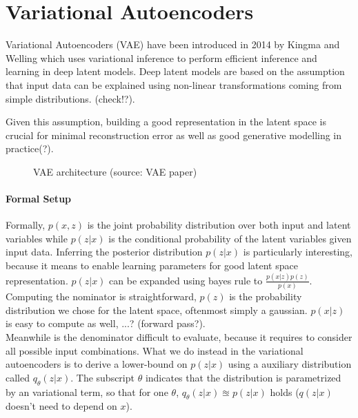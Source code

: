 \section{Variational Autoencoders \cite{vae:2013}}
\label{sec:vae}
Variational Autoencoders (VAE) have been introduced in 2014 by Kingma and Welling which uses variational inference to perform efficient inference and learning in deep latent models.
Deep latent models are based on the assumption that input data can be explained using non-linear transformations coming from simple distributions. \cite{rezende:2014} (check!?).

Given this assumption, building a good representation in the latent space is crucial for minimal reconstruction error as well as good generative modelling in practice(?).

\begin{figure}[htb]
\centering

  \caption{VAE architecture (source: VAE paper)}\label{fig:vae_architecture}
\end{figure}

\paragraph{Formal Setup}
Formally, $p(x,z)$ is the joint probability distribution over both input and latent variables while $p(z|x)$ is the conditional probability of the latent variables given input data.
Inferring the posterior distribution $p(z|x)$ is particularly interesting, because it means to enable learning parameters for good latent space representation.
$p(z|x)$ can be expanded using bayes rule to $\frac{p(x|z) p(z)}{p(x)}$.
Computing the nominator is straightforward, $p(z)$ is the probability distribution we chose for the latent space, oftenmost simply a gaussian.
$p(x|z)$ is easy to compute as well, ...? (forward pass?).\\
Meanwhile is the denominator difficult to evaluate, because it requires to consider all possible input combinations.
What we do instead in the variational autoencoders is to derive a lower-bound on $p(z|x)$ using a auxiliary distribution called $q_\theta(z|x)$. The subscript $\theta$ indicates that the distribution is parametrized by an variational term, so that for one $\theta$, $q_\theta(z|x) \approxeq p(z|x)$ holds ($q(z|x)$ doesn't need to depend on $x$).

